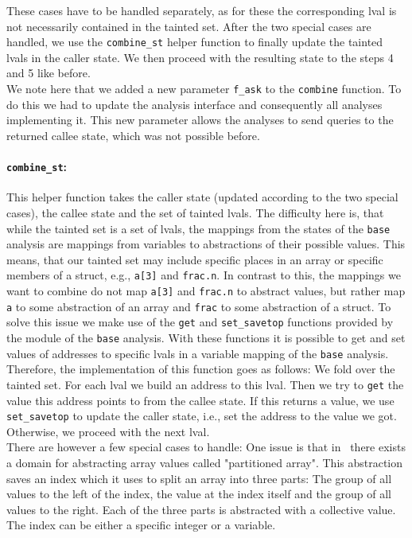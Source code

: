       These cases have to be handled separately, as for these the corresponding \ac{lval} is not necessarily contained in the tainted set. After the two special cases are handled, we use the \texttt{combine\_st} helper function to finally update the tainted \ac{lval}s in the caller state. We then proceed with the resulting state to the steps 4 and 5 like before.\\
      We note here that we added a new parameter \texttt{f\_ask} to the \texttt{combine} function. To do this we had to update the analysis interface and consequently all analyses implementing it. This new parameter allows the analyses to send queries to the returned callee state, which was not possible before.
      \paragraph{\texttt{combine\_st}:} This helper function takes the caller state (updated according to the two special cases), the callee state and the set of tainted \ac{lval}s. The difficulty here is, that while the tainted set is a set of \ac{lval}s, the mappings from the states of the \texttt{base} analysis are mappings from variables to abstractions of their possible values. This means, that our tainted set may include specific places in an array or specific members of a struct, e.g., \texttt{a[3]} and \texttt{frac.n}. In contrast to this, the mappings we want to combine do not map \texttt{a[3]} and \texttt{frac.n} to abstract values, but rather map \texttt{a} to some abstraction of an array and \texttt{frac} to some abstraction of a struct. To solve this issue we make use of the \texttt{get} and \texttt{set\_savetop} functions provided by the module of the \texttt{base} analysis. With these functions it is possible to get and set values of addresses to specific \ac{lval}s in a variable mapping of the \texttt{base} analysis.\\
      Therefore, the implementation of this function goes as follows: We fold over the tainted set. For each \ac{lval} we build an address to this \ac{lval}. Then we try to \texttt{get} the value this address points to from the callee state. If this returns a value, we use \texttt{set\_savetop} to update the caller state, i.e., set the address to the value we got. Otherwise, we proceed with the next \ac{lval}.\\
      There are however a few special cases to handle: One issue is that in \gob\ there exists a domain for abstracting array values called "partitioned array". This abstraction saves an index which it uses to split an array into three parts: The group of all values to the left of the index, the value at the index itself and the group of all values to the right. Each of the three parts is abstracted with a collective value. The index can be either a specific integer or a variable.\\
